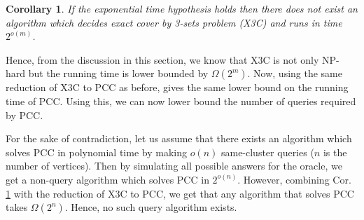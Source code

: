 \documentclass[12pt]{article}
\newtheorem{corollary}[theorem]{Corollary}
\begin{document}
\begin{corollary}
\label{cor:X3CLowerBound}
If the exponential time hypothesis holds then there does not exist an algorithm which decides exact cover by 3-sets problem (X3C) and runs in time $2^{o(m)}$.
\end{corollary}

Hence, from the discussion in this section, we know that X3C is not only NP-hard but the running time is lower bounded by $\Omega(2^m)$. Now, using the same reduction of X3C to PCC as before, gives the same lower bound on the running time of PCC. Using this, we can now lower bound the number of queries required by PCC.

For the sake of contradiction, let us assume that there exists an algorithm which solves PCC in polynomial time by making $o(n)$ same-cluster queries ($n$ is the number of vertices). Then by simulating all possible answers for the oracle, we get a non-query algorithm which solves PCC in $2^{o(n)}$. However, combining Cor. \ref{cor:X3CLowerBound} with the reduction of X3C to PCC, we get that any algorithm that solves PCC takes $\Omega(2^n)$. Hence, no such query algorithm exists. 

\ifdefined\COMPLETE
\else
\end{document}

